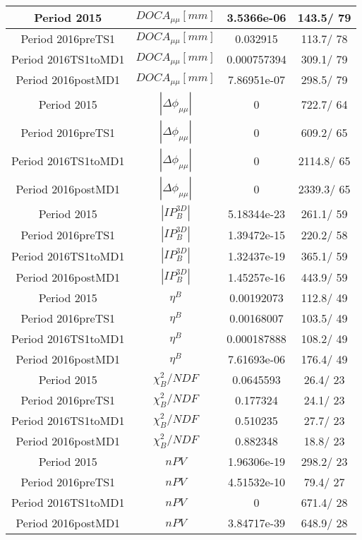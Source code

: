 \documentclass{article}
\begin{document}
\begin{longtable}{c|c|c|c}
\hline
 Period 2015 & $DOCA_{\mu\mu} [mm]$ & 3.5366e-06 & 143.5/ 79\\
\hline
 Period 2016preTS1 & $DOCA_{\mu\mu} [mm]$ & 0.032915 & 113.7/ 78\\
\hline
 Period 2016TS1toMD1 & $DOCA_{\mu\mu} [mm]$ & 0.000757394 & 309.1/ 79\\
\hline
 Period 2016postMD1 & $DOCA_{\mu\mu} [mm]$ & 7.86951e-07 & 298.5/ 79\\
\hline
 Period 2015 & $|\Delta\phi_{\mu\mu}|$ & 0 & 722.7/ 64\\
\hline
 Period 2016preTS1 & $|\Delta\phi_{\mu\mu}|$ & 0 & 609.2/ 65\\
\hline
 Period 2016TS1toMD1 & $|\Delta\phi_{\mu\mu}|$ & 0 & 2114.8/ 65\\
\hline
 Period 2016postMD1 & $|\Delta\phi_{\mu\mu}|$ & 0 & 2339.3/ 65\\
\hline
 Period 2015 & $|IP_{B}^{3D}|$ & 5.18344e-23 & 261.1/ 59\\
\hline
 Period 2016preTS1 & $|IP_{B}^{3D}|$ & 1.39472e-15 & 220.2/ 58\\
\hline
 Period 2016TS1toMD1 & $|IP_{B}^{3D}|$ & 1.32437e-19 & 365.1/ 59\\
\hline
 Period 2016postMD1 & $|IP_{B}^{3D}|$ & 1.45257e-16 & 443.9/ 59\\
\hline
 Period 2015 & $\eta^{B}$ & 0.00192073 & 112.8/ 49\\
\hline
 Period 2016preTS1 & $\eta^{B}$ & 0.00168007 & 103.5/ 49\\
\hline
 Period 2016TS1toMD1 & $\eta^{B}$ & 0.000187888 & 108.2/ 49\\
\hline
 Period 2016postMD1 & $\eta^{B}$ & 7.61693e-06 & 176.4/ 49\\
\hline
 Period 2015 & $\chi^{2}_{B}/NDF$ & 0.0645593 &  26.4/ 23\\
\hline
 Period 2016preTS1 & $\chi^{2}_{B}/NDF$ & 0.177324 &  24.1/ 23\\
\hline
 Period 2016TS1toMD1 & $\chi^{2}_{B}/NDF$ & 0.510235 &  27.7/ 23\\
\hline
 Period 2016postMD1 & $\chi^{2}_{B}/NDF$ & 0.882348 &  18.8/ 23\\
\hline
 Period 2015 & $nPV$ & 1.96306e-19 & 298.2/ 23\\
\hline
 Period 2016preTS1 & $nPV$ & 4.51532e-10 &  79.4/ 27\\
\hline
 Period 2016TS1toMD1 & $nPV$ & 0 & 671.4/ 28\\
\hline
 Period 2016postMD1 & $nPV$ & 3.84717e-39 & 648.9/ 28\\

\end{longtable}
\end{document}
